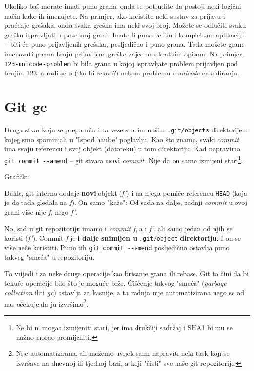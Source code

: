 Ukoliko baš morate imati puno grana, onda se potrudite da postoji neki logični način kako ih imenujete.
Na primjer, ako koristite neki sustav za prijavu i praćenje grešaka, onda svaka greška ima neki svoj broj.
Možete se odlučiti svaku grešku ispravljati u posebnoj grani. 
Imate li puno veliku i kompleksnu aplikaciju -- biti će puno prijavljenih grešaka, posljedično i puno grana.
Tada možete grane imenovati prema broju prijavljene greške zajedno s kratkim opisom.
Na primjer, \verb+123-unicode-problem+ bi bila grana u kojoj ispravljate problem prijavljen pod brojim 123, a radi se o (tko bi rekao?) nekom problemu s \emph{unicode} enkodiranju.

\section*{Git gc}

Druga stvar koju se preporuča ima veze s onim našim \verb+.git/objects+ direktorijem kojeg smo spominjali u "Ispod haube" poglavlju.
Kao što znamo, svaki \emph{commit} ima svoju referencu i svoj objekt (datoteku) u tom direktoriju.
Kad napravimo \verb+git commit --amend+ -- git stvara \textbf{novi} \emph{commit}.
Nije da on samo izmijeni stari\footnote{Ne bi ni mogao izmijeniti stari, jer ima drukčiji sadržaj i SHA1 bi mu se nužno morao promijeniti.}.

Grafički:



Dakle, git interno dodaje \textbf{novi} objekt (\emph{f'}) i na njega pomiče referencu \verb+HEAD+ (koja je do tada gledala na \emph f).
On samo "kaže": Od sada na dalje, zadnji \emph{commit} u ovoj grani više nije \emph f, nego \emph{f'}.

No, sad u git repozitoriju imamo i \emph{commit} \emph f, a i \emph{f'}, ali samo jedan od njih se koristi (\emph{f'}).
Commit \emph f je \textbf{i dalje snimljen u} \verb+.git/object+ \textbf{direktoriju}.
I on se više neće koristiti.
Puno tih \verb+git commit --amend+ posljedično ostavlja puno takvog "smeća" u repozitoriju.

To vrijedi i za neke druge operacije kao brisanje grana ili rebase.
Git to čini da bi tekuće operacije bilo što je moguće brže.
Čišćenje takvog "smeća" (\emph{garbage collection} iliti \emph{gc}) ostavlja za kasnije, a ta radnja nije automatizirana nego se od nas očekuje da ju izvršimo\footnote{Nije automatizirana, ali možemo uvijek sami napraviti neki task koji se izvršava na dnevnoj ili tjednoj bazi, a koji "čisti" sve naše git repozitorije.}.

